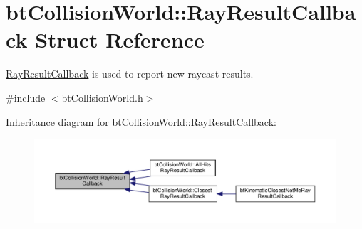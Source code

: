 \hypertarget{structbtCollisionWorld_1_1RayResultCallback}{}\section{bt\+Collision\+World\+:\+:Ray\+Result\+Callback Struct Reference}
\label{structbtCollisionWorld_1_1RayResultCallback}


\hyperlink{structbtCollisionWorld_1_1RayResultCallback}{Ray\+Result\+Callback} is used to report new raycast results.  




{\ttfamily \#include $<$bt\+Collision\+World.\+h$>$}



Inheritance diagram for bt\+Collision\+World\+:\+:Ray\+Result\+Callback\+:
\nopagebreak
\begin{figure}[H]
\begin{center}
\leavevmode
\includegraphics[width=350pt]{structbtCollisionWorld_1_1RayResultCallback__inherit__graph}
\end{center}
\end{figure}
